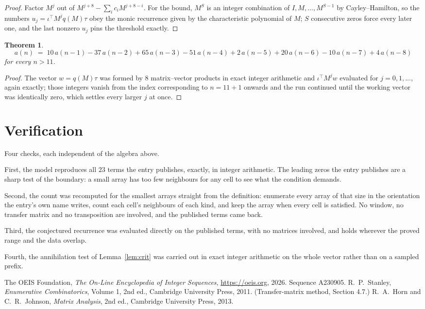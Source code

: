 \documentclass[11pt,a4paper]{article}
\theoremstyle{plain}
\newtheorem{theorem}{Theorem}
\theoremstyle{definition}
\begin{document}
\begin{proof}
Factor $M^{j}$ out of $M^{j+8}-\sum_ic_iM^{j+8-i}$. For the bound, $M^{S}$
is an integer combination of $I,M,\dots,M^{S-1}$ by Cayley--Hamilton, so the numbers
$u_j=\iota^{\!\top}M^{j}q(M)\tau$ obey the monic recurrence given by the characteristic
polynomial of $M$; $S$ consecutive zeros force every later one, and the last nonzero $u_j$
pins the threshold exactly.
\end{proof}

\begin{theorem}
\[
a(n)\;=\;10\,a(n-1) - 37\,a(n-2) + 65\,a(n-3) - 51\,a(n-4) + 2\,a(n-5) + 20\,a(n-6) - 10\,a(n-7) + 4\,a(n-8)
\]
for every $n>11$.
\end{theorem}

\begin{proof}
The vector $w=q(M)\tau$ was formed by $8$ matrix--vector products in exact integer
arithmetic and $\iota^{\!\top}M^{j}w$ evaluated for $j=0,1,\dots$, again exactly; those
integers vanish from the index corresponding to $n=11+1$ onwards and the run continued
until the working vector was identically zero, which settles every larger $j$ at once.
\end{proof}

\section{Verification}

Four checks, each independent of the algebra above.

First, the model reproduces all $23$ terms the entry publishes, exactly, in integer
arithmetic. The leading zeros the entry publishes are a sharp test of the boundary: a small
array has too few neighbours for any cell to see what the condition demands.

Second, the count was recomputed for the smallest arrays straight from the definition:
enumerate every array of that size in the orientation the entry's own name writes, count each
cell's neighbours of each kind, and keep the array when every cell is satisfied. No window, no
transfer matrix and no transposition are involved, and the published terms came back.

Third, the conjectured recurrence was evaluated directly on the published terms, with no
matrices involved, and holds wherever the proved range and the data overlap.

Fourth, the annihilation test of Lemma~\ref{lem:crit} was carried out in exact integer
arithmetic on the whole vector rather than on a sampled prefix.

\begin{thebibliography}{9}
 The OEIS Foundation, \emph{The On-Line Encyclopedia of Integer
Sequences}, \url{https://oeis.org}, 2026. Sequence A230905.
 R.~P.~Stanley, \emph{Enumerative Combinatorics}, Volume 1, 2nd ed.,
Cambridge University Press, 2011. (Transfer-matrix method, Section 4.7.)
 R.~A.~Horn and C.~R.~Johnson, \emph{Matrix Analysis}, 2nd ed., Cambridge
University Press, 2013.
\end{thebibliography}
\end{document}
